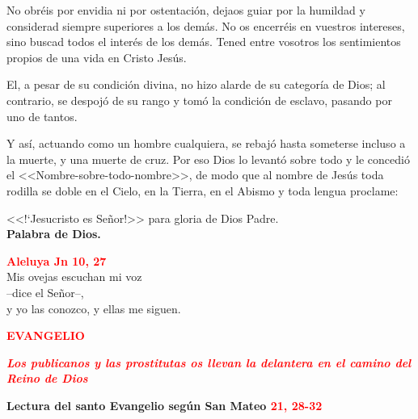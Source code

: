 \documentclass[12pt, letterpaper]{report}
\begin{document}
No obr\'eis por envidia ni por ostentaci\'on, dejaos guiar por la humildad y considerad siempre superiores a los dem\'as. No os encerr\'eis en vuestros intereses, sino buscad todos el inter\'es de los dem\'as. Tened entre vosotros los sentimientos propios de una vida en Cristo Jes\'us.

El, a pesar de su condici\'on divina, no hizo alarde de su categor\'ia de Dios; al contrario, se despoj\'o de su rango y tom\'o la condici\'on de esclavo, pasando por uno de tantos.

Y as\'i, actuando como un hombre cualquiera, se rebaj\'o hasta someterse incluso a la muerte, y una muerte de cruz. Por eso Dios lo levant\'o sobre todo y le concedi\'o el <<Nombre-sobre-todo-nombre>>, de modo que al nombre de Jes\'us toda rodilla se doble en el Cielo, en la Tierra, en el Abismo y toda lengua proclame:

<<!`Jesucristo es Se\~nor!>> para gloria de Dios Padre.\\

{\bfseries Palabra de Dios.}


\begin{center}
\Large {\bfseries \textcolor{red}{Aleluya \hspace{1cm} Jn 10, 27}} \\
Mis ovejas escuchan mi voz\\
--dice el Se\~nor--,\\
y yo las conozco, y ellas me siguen.
\end{center}

\begin{center}
\Large {\bfseries \textcolor{red}{EVANGELIO}}
\end{center}

\begin{center}
\large {\bfseries \textit{ \textcolor{red}{Los publicanos y las prostitutas os llevan la delantera en el camino del Reino de Dios}}}
\end{center}

\Huge \textcolor{red}{} \Large {\bfseries Lectura del santo Evangelio seg\'un San Mateo \hspace{1cm} \textcolor{red}{21, 28-32}}
\end{document}
